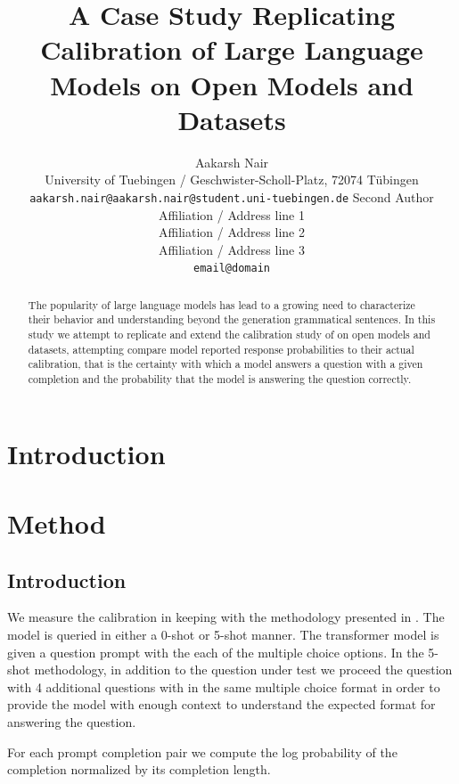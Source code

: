 \documentclass[11pt]{article}
\title{A Case Study Replicating Calibration of Large Language Models on Open Models and Datasets}
\author{Aakarsh Nair\\
  University of Tuebingen / Geschwister-Scholl-Platz, 72074 Tübingen\\
  \texttt{aakarsh.nair@aakarsh.nair@student.uni-tuebingen.de} 
  Second Author \\
  Affiliation / Address line 1 \\
  Affiliation / Address line 2 \\
  Affiliation / Address line 3 \\
  \texttt{email@domain} \\}
\begin{document}
\maketitle

\begin{abstract}
  The popularity of large language models has lead to a growing 
need to characterize their behavior and understanding 
beyond the generation grammatical sentences. In this study we 
attempt to replicate and extend the calibration study of 
\cite{kadavath2022language} on open models and datasets, 
attempting compare model reported response probabilities to 
their actual calibration, that is the certainty with which a model answers 
a question with a given completion and the probability that the 
model is answering the question correctly. 
\end{abstract}

\section{Introduction}


\section{Method}

\subsection{Introduction}

We measure the calibration in keeping with the methodology presented 
in  \cite{kadavath2022language}. The model is queried in either a
0-shot or 5-shot manner. The transformer model is given a question 
prompt  with the each of the multiple choice options.  In the 5-shot 
methodology, in addition to the question under test we proceed the 
question with 4 additional questions with in the same multiple 
choice format in order to provide the model with enough context to 
understand the expected format for answering the question.

For each prompt completion pair we compute the log probability of 
the completion normalized by its completion length. 
\end{document}
